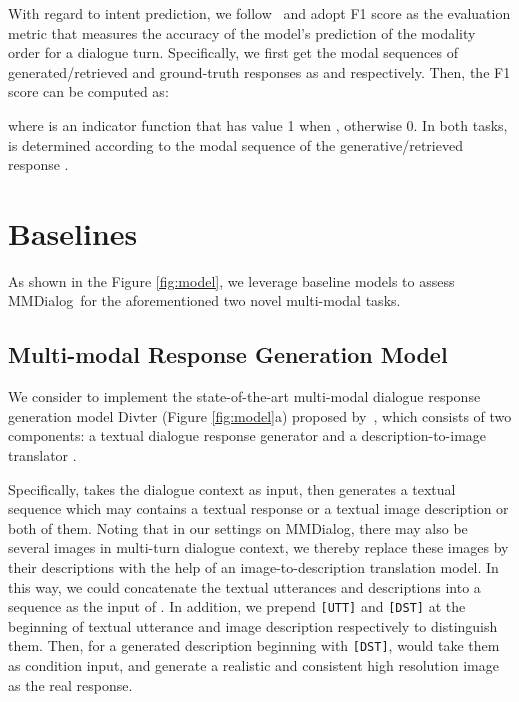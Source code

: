 \documentclass[11pt]{article}
\newcommand{\DataName}{MMDialog}
\begin{document}
With regard to intent prediction, we follow~\citet{zang-etal-2021-photochat} and adopt F1 score as the evaluation metric that measures the accuracy of the model's prediction of the modality order for a dialogue turn. Specifically, we first get the modal sequences of generated/retrieved and ground-truth responses as  and  respectively. Then, the F1 score can be computed as:

where  is an indicator function that has value 1 when , otherwise 0. In both tasks,  is determined according to the modal sequence of the generative/retrieved response . 



















 
\section{Baselines}
As shown in the Figure \ref{fig:model}, we leverage baseline models to assess \DataName~for the aforementioned two novel multi-modal tasks.

\subsection{Multi-modal Response Generation Model}
We consider to implement the state-of-the-art multi-modal dialogue response generation model Divter (Figure \ref{fig:model}a) proposed by~\citet{sun-etal-2022-multimodal}, which consists of two components: a textual dialogue response generator  and a description-to-image translator . 

Specifically,  takes the dialogue context   as input, then generates a textual sequence which may contains a textual response   or a textual image description  or both of them. Noting that in our settings on \DataName, there may also be several images  in multi-turn dialogue context, we thereby replace these images by their descriptions  with the help of an image-to-description translation model. In this way, we could concatenate the textual utterances  and descriptions into a sequence as the input of . In addition, we prepend \texttt{[UTT]} and \texttt{[DST]} at the beginning of textual utterance and image description respectively to distinguish them. Then, for a generated   description  beginning with \texttt{[DST]},  would take them as condition input, and generate a realistic and consistent high resolution image  as the real response. 
\end{document}
